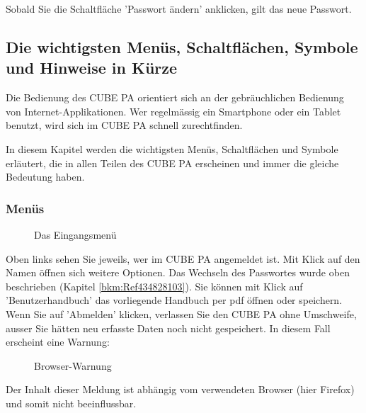 Sobald Sie die Schaltfläche 'Passwort ändern' anklicken, gilt das neue Passwort.

\subsection{Die wichtigsten Menüs, Schaltflächen, Symbole und Hinweise in Kürze}

Die Bedienung des CUBE PA orientiert sich an der gebräuchlichen Bedienung von Internet-Applikationen. Wer regelmässig ein Smartphone oder ein Tablet benutzt, wird sich im CUBE PA schnell zurechtfinden.

\vspace{\baselineskip}

In diesem Kapitel werden die wichtigsten Menüs, Schaltflächen und Symbole erläutert, die in allen Teilen des CUBE PA erscheinen und immer die gleiche Bedeutung haben.

\pagebreak

\subsubsection{Menüs}

\begin{figure}[H]
\caption{Das Eingangsmenü}
\end{figure}


Oben links sehen Sie jeweils, wer im CUBE PA angemeldet ist. Mit Klick auf den Namen öffnen sich weitere Optionen. Das Wechseln des Passwortes wurde oben beschrieben (Kapitel \ref{bkm:Ref434828103}). 
Sie können mit Klick auf 'Benutzerhandbuch' das vorliegende Handbuch per pdf öffnen oder speichern. Wenn Sie auf 'Abmelden' klicken, verlassen Sie den CUBE PA ohne Umschweife, ausser Sie hätten neu erfasste Daten noch nicht gespeichert. In diesem Fall erscheint eine Warnung:

\begin{figure}[H]
\caption{Browser-Warnung}
\end{figure}
\begin{small}
Der Inhalt dieser Meldung ist abhängig vom verwendeten Browser (hier Firefox) und somit nicht beeinflussbar.
\end{small}

